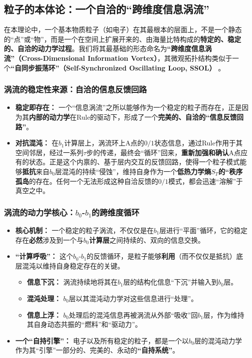\documentclass[11pt, a4paper]{article}
\begin{document}
\subsection{粒子的本体论：一个自洽的“跨维度信息涡流”}

在本理论中，一个基本物质粒子（如电子）在其最根本的层面上，不是一个静态的“点”或“物”，而是一个在空间上扩展开来的、由海量比特构成的\textbf{特定的、稳定的、自洽的动力学过程}。我们将其最基础的形态命名为\textbf{“跨维度信息涡流”（Cross-Dimensional Information Vortex）}，其微观拓扑结构类似于一个\textbf{“自同步振荡环”（Self-Synchronized Oscillating Loop, SSOL）} \cite{DrazinJohnson1989, Skyrme1961}。

\subsubsection{涡流的稳定性来源：自洽的信息反馈回路}
\begin{itemize}
    \item \textbf{稳定即存在：} 一个“信息涡流”之所以能够作为一个稳定的粒子而存在，正是因为其\textbf{内部的动力学}在Rule的驱动下，形成了一个\textbf{完美的、自洽的“信息反馈回路”}。
    \item \textbf{对抗混沌：} 在$b_1$计算层上，涡流环上A点的$0/1$状态信息，通过Rule作用于其空间邻居，经过一系列$\tau$步的传递，最终会“循环”回来，\textbf{重新加强和确认}A点应有的状态。正是这个内禀的、基于层内交互的反馈回路，使得一个粒子模式能够\textbf{抵抗}来自$b_0$层混沌的持续“侵蚀”，维持自身作为一个\textbf{低热力学熵$S_T$的“秩序孤岛}的存在。任何一个无法形成这种自洽反馈的$0/1$模式，都会迅速“溶解”于真空之中。
\end{itemize}

\subsubsection{涡流的动力学核心：$b_0$-$b_1$的跨维度循环}
\begin{itemize}
    \item \textbf{核心机制：} 一个稳定的粒子涡流，不仅仅是在$b_1$层进行“平面”循环，它的稳定存在\textbf{必然}涉及到一个与\textbf{$b_0$计算层}之间持续的、双向的信息交换。
    \item \textbf{“计算呼吸”：} 这个$b_0$-$b_1$的反馈循环，是粒子能够\textbf{利用}（而不仅仅是抵抗）底层混沌以维持自身稳定存在的关键。
    \begin{itemize}
        \item \textbf{信息下沉：} 涡流持续地将其在$b_1$层的结构化信息“下沉”并输入到$b_0$层。
        \item \textbf{混沌处理：} $b_0$层以其混沌动力学对这些信息进行“处理”。
        \item \textbf{信息上浮：} $b_0$处理后的混沌信息再被涡流从外部“吸收”回$b_1$层，作为维持其自身动态共振的“燃料”和“驱动力”。
    \end{itemize}
    \item \textbf{一个“自持引擎”：} 电子以及所有稳定的粒子，都是一个以$b_0$层的混沌动力学作为其“引擎”一部分的、完美的、永动的\textbf{“自持系统”}。
\end{itemize}
\end{document}
